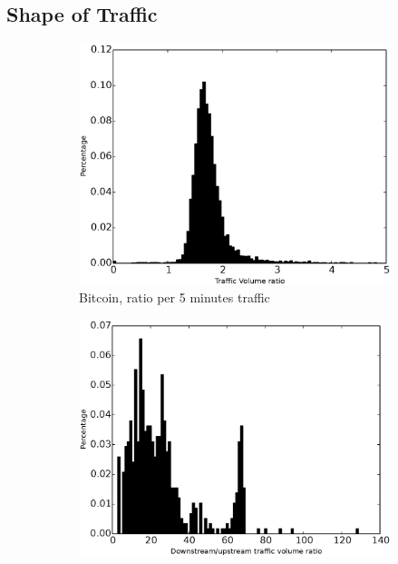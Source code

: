 \subsection{Shape of Traffic}\label{sec:shape_of_traffic}
\begin{figure}
\centering
\begin{subfigure}{0.16\linewidth}
\includegraphics[width=\linewidth]{image/ratio_downstream_upstream_traffic_volume_bitcoin.eps}
\caption{Bitcoin, ratio per 5 minutes traffic}
\label{fig:ratio_downstream_upstream_traffic_volume_bitcoin}
\end{subfigure}
\begin{subfigure}{0.16\linewidth}
\includegraphics[width=\linewidth]{image/ratio_downstream_upstream_traffic_volume_http.eps}

\end{subfigure}
\end{figure}

